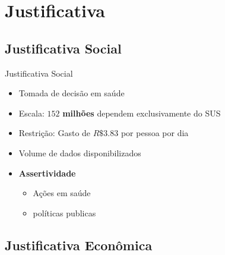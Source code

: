 \documentclass[10pt,brazil]{beamer}
\theoremstyle{definition}
\begin{document}
\section{Justificativa}

\subsection{Justificativa Social}

\begin{frame}{Justificativa Social}

      \begin{itemize}
            \item Tomada de decisão em saúde
            \item Escala: $152$ \textbf{milhões} dependem exclusivamente do SUS
            \item Restrição: Gasto de $R\$3.83$ por pessoa por dia
            \item Volume de dados disponibilizados 
            \item \textbf{Assertividade}
      \begin{itemize}
          \item Ações em saúde
          \item políticas publicas
      \end{itemize}
      \end{itemize}
 
\end{frame}

\subsection{Justificativa Econômica}
\end{document}
